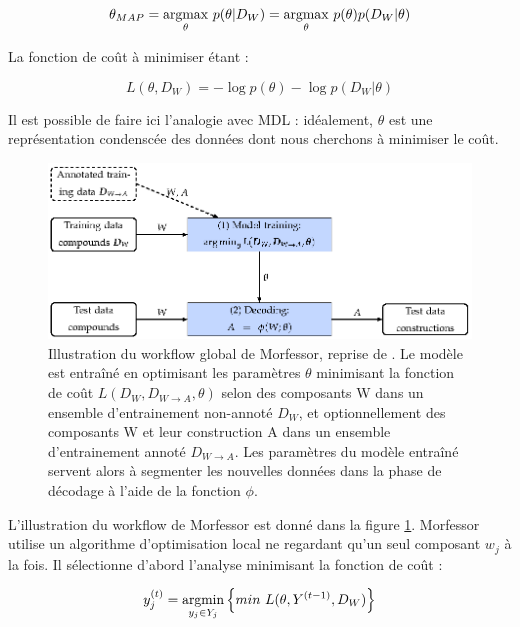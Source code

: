 \documentclass[PhD-Yoann-Dupont.tex]{subfiles}
\begin{document}
\begin{equation}
\theta_{MAP} = \underset{\theta}{\operatorname{argmax}}\ p(\theta | D_{W}) = \underset{\theta}{\operatorname{argmax}}\ p(\theta)p(D_{W} | \theta)
\end{equation}

La fonction de coût à minimiser étant :

\begin{equation}\label{eq:L-theta}
L(\theta, D_{W}) = -\log p(\theta) - \log p(D_{W} | \theta)
\end{equation}

Il est possible de faire ici l'analogie avec MDL : idéalement, $\theta$ est une représentation condenscée des données dont nous cherchons à minimiser le coût.

\begin{figure}[ht!]
\centering
\includegraphics[scale=1.0]{images/morfessor/morfessor-workflow}
\caption{Illustration du workflow global de Morfessor, reprise de \citet{virpioja2013morfessor}. Le modèle est entraîné en optimisant les paramètres $\theta$ minimisant la fonction de coût $L(D_{W}, D_{W \rightarrow A}, \theta)$ selon des composants W dans un ensemble d'entrainement non-annoté $D_{W}$, et optionnellement des composants W et leur construction A dans un ensemble d'entrainement annoté $D_{W \rightarrow A}$. Les paramètres du modèle entraîné servent alors à segmenter les nouvelles données dans la phase de décodage à l'aide de la fonction $\phi$.}
\label{fig:morfessor-workflow}
\end{figure}

L'illustration du workflow de Morfessor est donné dans la figure \ref{fig:morfessor-workflow}. Morfessor utilise un algorithme d'optimisation local ne regardant qu'un seul composant $w_{j}$ à la fois. Il sélectionne d'abord l'analyse minimisant la fonction de coût :

\begin{equation}
y^{(t)}_{j} = \underset{y_{j} \in Y_{j}}{\operatorname{argmin}} \left \{ min\ L(\theta, Y^{(t-1)}, D_{W}) \right \}
\end{equation}
\end{document}
